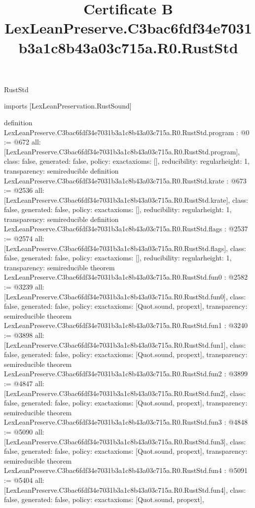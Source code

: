 \begin{lexlean}{RustStd}
\title{Certificate B LexLeanPreserve.C3bac6fdf34e7031b3a1c8b43a03c715a.R0.RustStd}
\begin{coremodule}
imports [LexLeanPreservation.RustSound]

definition LexLeanPreserve.C3bac6fdf34e7031b3a1c8b43a03c715a.R0.RustStd.program : @0 := @672 {
  all: [LexLeanPreserve.C3bac6fdf34e7031b3a1c8b43a03c715a.R0.RustStd.program],
  class: false,
  generated: false,
  policy: exact{axioms: []},
  reducibility: regular{height: 1},
  transparency: semireducible
}
definition LexLeanPreserve.C3bac6fdf34e7031b3a1c8b43a03c715a.R0.RustStd.krate : @673 := @2536 {
  all: [LexLeanPreserve.C3bac6fdf34e7031b3a1c8b43a03c715a.R0.RustStd.krate],
  class: false,
  generated: false,
  policy: exact{axioms: []},
  reducibility: regular{height: 1},
  transparency: semireducible
}
definition LexLeanPreserve.C3bac6fdf34e7031b3a1c8b43a03c715a.R0.RustStd.flags : @2537 := @2574 {
  all: [LexLeanPreserve.C3bac6fdf34e7031b3a1c8b43a03c715a.R0.RustStd.flags],
  class: false,
  generated: false,
  policy: exact{axioms: []},
  reducibility: regular{height: 1},
  transparency: semireducible
}
theorem LexLeanPreserve.C3bac6fdf34e7031b3a1c8b43a03c715a.R0.RustStd.fun0 : @2582 := @3239 {
  all: [LexLeanPreserve.C3bac6fdf34e7031b3a1c8b43a03c715a.R0.RustStd.fun0],
  class: false,
  generated: false,
  policy: exact{axioms: [Quot.sound, propext]},
  transparency: semireducible
}
theorem LexLeanPreserve.C3bac6fdf34e7031b3a1c8b43a03c715a.R0.RustStd.fun1 : @3240 := @3898 {
  all: [LexLeanPreserve.C3bac6fdf34e7031b3a1c8b43a03c715a.R0.RustStd.fun1],
  class: false,
  generated: false,
  policy: exact{axioms: [Quot.sound, propext]},
  transparency: semireducible
}
theorem LexLeanPreserve.C3bac6fdf34e7031b3a1c8b43a03c715a.R0.RustStd.fun2 : @3899 := @4847 {
  all: [LexLeanPreserve.C3bac6fdf34e7031b3a1c8b43a03c715a.R0.RustStd.fun2],
  class: false,
  generated: false,
  policy: exact{axioms: [Quot.sound, propext]},
  transparency: semireducible
}
theorem LexLeanPreserve.C3bac6fdf34e7031b3a1c8b43a03c715a.R0.RustStd.fun3 : @4848 := @5090 {
  all: [LexLeanPreserve.C3bac6fdf34e7031b3a1c8b43a03c715a.R0.RustStd.fun3],
  class: false,
  generated: false,
  policy: exact{axioms: [Quot.sound, propext]},
  transparency: semireducible
}
theorem LexLeanPreserve.C3bac6fdf34e7031b3a1c8b43a03c715a.R0.RustStd.fun4 : @5091 := @5404 {
  all: [LexLeanPreserve.C3bac6fdf34e7031b3a1c8b43a03c715a.R0.RustStd.fun4],
  class: false,
  generated: false,
  policy: exact{axioms: [Quot.sound, propext]},
}
\end{coremodule}
\end{lexlean}
